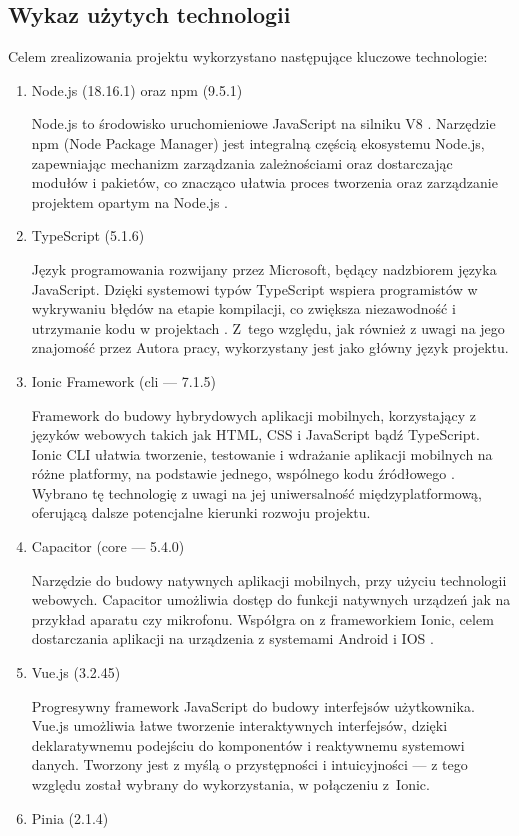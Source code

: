 \subsection{Wykaz użytych technologii}
Celem zrealizowania projektu wykorzystano następujące kluczowe technologie:
\begin{enumerate}
	\item Node.js (18.16.1) oraz npm (9.5.1)

	      Node.js to środowisko uruchomieniowe JavaScript na silniku V8 \cite{node}.
	      Narzędzie npm (Node Package Manager) jest integralną częścią ekosystemu Node.js,
	      zapewniając mechanizm zarządzania zależnościami oraz dostarczając modułów i pakietów,
	      co znacząco ułatwia proces tworzenia oraz zarządzanie projektem opartym na Node.js \cite{npm}.
	\item TypeScript (5.1.6)

	      Język programowania rozwijany przez Microsoft, będący nadzbiorem języka JavaScript.
	      Dzięki systemowi typów TypeScript wspiera programistów w wykrywaniu błędów na etapie kompilacji,
	      co zwiększa niezawodność i utrzymanie kodu w projektach \cite{ts}.
	      Z~tego względu, jak również z uwagi na jego znajomość
	      przez Autora pracy, wykorzystany jest jako główny język projektu.
	\item Ionic Framework (cli — 7.1.5)

	      Framework do budowy hybrydowych aplikacji mobilnych, korzystający z języków webowych takich jak HTML,
	      CSS i JavaScript bądź TypeScript.
	      Ionic CLI ułatwia tworzenie, testowanie i wdrażanie aplikacji mobilnych na różne platformy, na podstawie jednego,
	      wspólnego kodu źródłowego \cite{ionic}.
	      Wybrano tę technologię z uwagi na jej uniwersalność międzyplatformową, oferującą dalsze potencjalne kierunki
	      rozwoju projektu.
	\item Capacitor (core — 5.4.0)

	      Narzędzie do budowy natywnych aplikacji mobilnych, przy użyciu technologii webowych.
	      Capacitor umożliwia dostęp do funkcji natywnych urządzeń jak na przykład aparatu czy mikrofonu.
	      Współgra on z frameworkiem Ionic, celem dostarczania aplikacji na urządzenia z systemami Android i IOS \cite{capacitor}.
	\item Vue.js (3.2.45)

	      Progresywny framework JavaScript do budowy interfejsów użytkownika.
	      Vue.js umożliwia łatwe tworzenie interaktywnych interfejsów, dzięki deklaratywnemu podejściu do komponentów i
	      reaktywnemu systemowi danych. Tworzony jest z myślą o przystępności i intuicyjności \cite{vue}
	      — z tego względu został wybrany do wykorzystania, w połączeniu z~Ionic.
	\item Pinia (2.1.4)


\end{enumerate}
